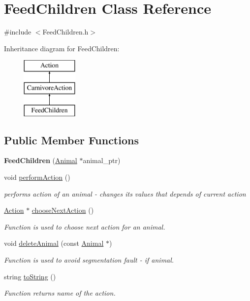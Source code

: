 \hypertarget{class_feed_children}{}\section{Feed\+Children Class Reference}
\label{class_feed_children}


{\ttfamily \#include $<$Feed\+Children.\+h$>$}

Inheritance diagram for Feed\+Children\+:\begin{figure}[H]
\begin{center}
\leavevmode
\includegraphics[height=3.000000cm]{class_feed_children}
\end{center}
\end{figure}
\subsection*{Public Member Functions}
\begin{DoxyCompactItemize}
\item 
\hypertarget{class_feed_children_aeb47c04ff7ded91a840c3c1057a5a820}{}{\bfseries Feed\+Children} (\hyperlink{class_animal}{Animal} $\ast$animal\+\_\+ptr)\label{class_feed_children_aeb47c04ff7ded91a840c3c1057a5a820}

\item 
void \hyperlink{class_feed_children_a1bd88e57f553954f1eda70b7a38b1c92}{perform\+Action} ()
\begin{DoxyCompactList}\small\item\em performs action of an animal -\/ changes it\textquotesingle{}s values that depends of current action \end{DoxyCompactList}\item 
\hyperlink{class_action}{Action} $\ast$ \hyperlink{class_feed_children_a22a9852c7ca1c0f0016872800b9f993a}{choose\+Next\+Action} ()
\begin{DoxyCompactList}\small\item\em Function is used to choose next action for an animal. \end{DoxyCompactList}\item 
void \hyperlink{class_feed_children_a06823808a9e61b52f6e0cbccf360a93f}{delete\+Animal} (const \hyperlink{class_animal}{Animal} $\ast$)
\begin{DoxyCompactList}\small\item\em Function is used to avoid segmentation fault -\/ if animal. \end{DoxyCompactList}\item 
string \hyperlink{class_feed_children_a2835ed51028709e527a343af495db85b}{to\+String} ()
\begin{DoxyCompactList}\small\item\em Function returns name of the action. \end{DoxyCompactList}\end{DoxyCompactItemize}

